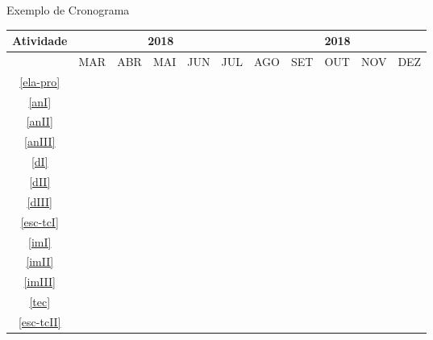 \begin{quadro}[!htbp]
	\centering
	\caption{Exemplo de Cronograma}
		\begin{tabular}{|c|c|c|c|c|c|c|c|c|c|c|}
		\hline
		Atividade&\multicolumn{5}{c|}{2018}&\multicolumn{5}{c|}{2018}\\
		\hline
		&MAR&ABR&MAI&JUN&JUL&AGO&SET&OUT&NOV&DEZ\\
		\hline
		\ref{ela-pro}&\cellcolor{midgray}&&&&&&&&&\\
		\hline
		\ref{anI}&&\cellcolor{midgray}&&&&&&&&\\
		\hline	
		\ref{anII}&&\cellcolor{midgray}&&&&&&&&\\
		\hline			
		\ref{anIII}&&\cellcolor{midgray}&\cellcolor{midgray}&&&&&&&\\
		\hline	
		\ref{dI}&&&\cellcolor{midgray}&&&&&&&\\
		\hline
		\ref{dII}&&&\cellcolor{midgray}&\cellcolor{midgray}&&&&&&\\
		\hline	
		\ref{dIII}&&&&\cellcolor{midgray}&\cellcolor{midgray}&&&&&\\
		\hline	
		\ref{esc-tcI}&&&\cellcolor{midgray}&\cellcolor{midgray}&\cellcolor{midgray}&&&&&\\
		\hline	
		\ref{imI}&&&&&\cellcolor{midgray}&&&&&\\
		\hline	
		\ref{imII}&&&&&&\cellcolor{midgray}&&&&\\
		\hline	
		\ref{imIII}&&&&&&\cellcolor{midgray}&\cellcolor{midgray}&\cellcolor{midgray}&&\\
		\hline	
		\ref{tec}&&&&&&&&\cellcolor{midgray}&\cellcolor{midgray}&\\
		\hline	
		\ref{esc-tcII}&&&&&&&&\cellcolor{midgray}&\cellcolor{midgray}&\cellcolor{midgray}\\
		\hline	
		\end{tabular}
		\label{qua:cronograma}
\end{quadro}